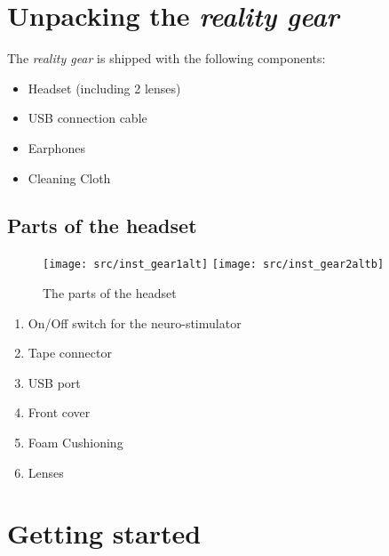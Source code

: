 \section[Unpacking the \emph{\pokeT{} reality gear}]{Unpacking the \emph{\poke{} reality gear}}

The \emph{\poke{} reality gear} is shipped with the following components:

\begin{itemize}
\item Headset (including 2 lenses)
\item USB connection cable
\item Earphones
\item Cleaning Cloth
\end{itemize}


\subsection*{Parts of the headset}

\begin{figure}[!ht]
\begin{center}
\texttt{[image: src/inst\_gear1alt]}
\texttt{[image: src/inst\_gear2altb]}
\end{center}
\caption{The parts of the headset}
\label{gear_parts}
\end{figure}

\begin{enumerate}
\item On/Off switch for the neuro-stimulator
\item Tape connector
\item USB port
\item Front cover
\item Foam Cushioning 
\item Lenses
\end{enumerate}

\section{Getting started}

